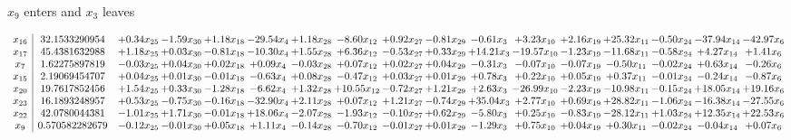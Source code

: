 \documentclass[9pt]{article}
\begin{document}
 $ x_{9} $ enters and $ x_{3} $ leaves 

 \[\begin{array}{c| c c@{\hskip 2pt} c@{\hskip 2pt} c@{\hskip 2pt} c@{\hskip 2pt} c@{\hskip 2pt} c@{\hskip 2pt} c@{\hskip 2pt} c@{\hskip 2pt} c@{\hskip 2pt} c@{\hskip 2pt} c@{\hskip 2pt} c@{\hskip 2pt} c@{\hskip 2pt} c@{\hskip 2pt} c@{\hskip 2pt} }
 x_{16}   &  32.1533290954 & +  0.34 x_{25} & -1.59 x_{30} & +  1.18 x_{18} & -29.54 x_{4} & +  1.18 x_{28} & -8.60 x_{12} & +  0.92 x_{27} & -0.81 x_{29} & -0.61 x_{3} & +  3.23 x_{10} & +  2.16 x_{19} & + 25.32 x_{11} & -0.50 x_{24} & -37.94 x_{14} & -42.97 x_{6}\\
 x_{17}   &  45.4381632988 & +  1.18 x_{25} & +  0.03 x_{30} & -0.81 x_{18} & -10.30 x_{4} & +  1.55 x_{28} & +  6.36 x_{12} & -0.53 x_{27} & +  0.33 x_{29} & + 14.21 x_{3} & -19.57 x_{10} & -1.23 x_{19} & -11.68 x_{11} & -0.58 x_{24} & +  4.27 x_{14} & +  1.41 x_{6}\\
 x_{7}   &  1.62275897819 & -0.03 x_{25} & +  0.04 x_{30} & +  0.02 x_{18} & +  0.09 x_{4} & -0.03 x_{28} & +  0.07 x_{12} & +  0.02 x_{27} & +  0.04 x_{29} & -0.31 x_{3} & -0.07 x_{10} & -0.07 x_{19} & -0.50 x_{11} & -0.02 x_{24} & +  0.63 x_{14} & -0.26 x_{6}\\
 x_{15}   &  2.19069454707 & +  0.04 x_{25} & +  0.01 x_{30} & -0.01 x_{18} & -0.63 x_{4} & +  0.08 x_{28} & -0.47 x_{12} & +  0.03 x_{27} & +  0.01 x_{29} & +  0.78 x_{3} & +  0.22 x_{10} & +  0.05 x_{19} & +  0.37 x_{11} & -0.01 x_{24} & -0.24 x_{14} & -0.87 x_{6}\\
 x_{20}   &  19.7617852456 & +  1.54 x_{25} & +  0.33 x_{30} & -1.28 x_{18} & -6.62 x_{4} & +  1.32 x_{28} & + 10.55 x_{12} & -0.72 x_{27} & +  1.21 x_{29} & +  2.63 x_{3} & -26.99 x_{10} & -2.23 x_{19} & -10.98 x_{11} & -0.15 x_{24} & + 18.05 x_{14} & + 19.16 x_{6}\\
 x_{23}   &  16.1893248957 & +  0.53 x_{25} & -0.75 x_{30} & -0.16 x_{18} & -32.90 x_{4} & +  2.11 x_{28} & +  0.07 x_{12} & +  1.21 x_{27} & -0.74 x_{29} & + 35.04 x_{3} & +  2.77 x_{10} & +  0.69 x_{19} & + 28.82 x_{11} & -1.06 x_{24} & -16.38 x_{14} & -27.55 x_{6}\\
 x_{22}   &  42.0780044381 & -1.01 x_{25} & +  1.71 x_{30} & -0.01 x_{18} & + 18.06 x_{4} & -2.07 x_{28} & -1.93 x_{12} & -0.10 x_{27} & +  0.62 x_{29} & -5.80 x_{3} & +  0.25 x_{10} & -0.83 x_{19} & -28.12 x_{11} & +  1.03 x_{24} & + 12.35 x_{14} & + 22.53 x_{6}\\
 x_{9}   &  0.570582282679 & -0.12 x_{25} & -0.01 x_{30} & +  0.05 x_{18} & +  1.11 x_{4} & -0.14 x_{28} & -0.70 x_{12} & -0.01 x_{27} & +  0.01 x_{29} & -1.29 x_{3} & +  0.75 x_{10} & +  0.04 x_{19} & +  0.30 x_{11} & -0.02 x_{24} & -0.04 x_{14} & +  0.07 x_{6}\\

\end{array}\]
\end{document}
